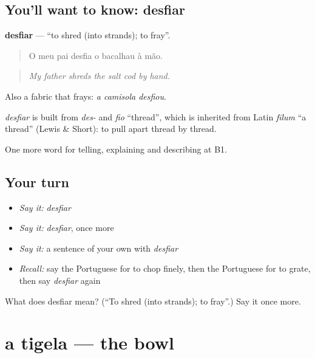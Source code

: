 \subsection*{You'll want to know: desfiar}
\textbf{desfiar} — \textquotedblleft{}to shred (into strands); to fray\textquotedblright{}.

\begin{quote}
O meu pai desfia o bacalhau à mão.
\end{quote}

\begin{quote}
\emph{My father shreds the salt cod by hand.}
\end{quote}

Also a fabric that frays: \emph{a camisola desfiou}.

\begin{cousinweb}
\emph{desfiar} is built from \emph{des-} and \emph{fio} \textquotedblleft{}thread\textquotedblright{}, which is inherited from Latin \emph{fīlum} \textquotedblleft{}a thread\textquotedblright{} (Lewis \& Short): to pull apart thread by thread.
\end{cousinweb}

\begin{grammarlens}[title={What you've built}]
One more word for telling, explaining and describing at B1.
\end{grammarlens}

\subsection*{Your turn}
\begin{itemize}
\raggedright
  \item \emph{Say it:} \emph{desfiar}
  \item \emph{Say it:} \emph{desfiar}, once more
  \item \emph{Say it:} a sentence of your own with \emph{desfiar}
  \item \emph{Recall:} say the Portuguese for to chop finely, then the Portuguese for to grate, then say \emph{desfiar} again
\end{itemize}

\begin{tcolorbox}[breakable,colback=teal!4,colframe=teal!35!black,title={Before you move on}]
What does desfiar mean? (\textquotedblleft{}To shred (into strands); to fray\textquotedblright{}.) Say it once more.
\end{tcolorbox}
\section[a tigela]{a tigela — the bowl}

